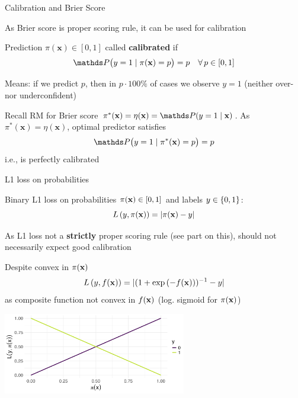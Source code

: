 \documentclass[11pt,compress,t,notes=noshow, xcolor=table]{beamer}
\begin{document}
\begin{vbframe}{Calibration and Brier Score}

\begin{itemizeL}
    \item As Brier score is proper scoring rule, it can be used for calibration
    \item Prediction $\pi(\mathbf{x})\in[0,1]$ called \textbf{calibrated} if 
$$\P\bigl(y=1 \mid \pi(\mathbf{x})=p\bigr)=p \quad \forall\, p\in[0,1]$$
    \item Means: if we predict $p$, then in $p \cdot 100\%$ of cases we observe $y=1$ (neither over- nor underconfident)
    \item Recall RM for Brier score $\pi^*(\mathbf{x}) = \eta(\mathbf{x}) = \P(y=1 \mid \mathbf{x})$. As \(\pi^*(\mathbf{x})=\eta(\mathbf{x})\), optimal predictor satisfies $$\P\bigl(y=1 \mid \pi^*(\mathbf{x})=p\bigr)=p$$
i.e., is perfectly calibrated
\end{itemizeL}

\end{vbframe}

\begin{vbframe}{L1 loss on probabilities}
\begin{itemizeM}
    \item Binary L1 loss on probabilities $\pi(\mathbf{x}) \in [0, 1]$ and labels $y \in \{0, 1\}$: $$L\left(y, \pi(\mathbf{x})\right) = |\pi(\mathbf{x}) - y|$$
    \item As L1 loss not a \textbf{strictly} proper scoring rule (see part on this), should not necessarily expect good calibration
    \item Despite convex in $\pi(\mathbf{x})$ $$L\left(y, f(\mathbf{x})\right)=|(1+\exp{(-f(\mathbf{x}))})^{-1}-y|$$ as composite function not convex in $f(\mathbf{x})$ (log. sigmoid for $\pi(\mathbf{x})$)
\end{itemizeM}

\begin{center}
\includegraphics[width = 0.6\textwidth]{figure/l1_loss.png}
\end{center}


\end{vbframe}





\endlecture
\end{document}
